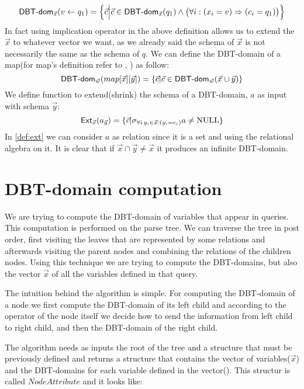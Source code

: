 \documentclass[12pt]{article}
\begin{document}
\begin{equation}
\label{assign2}
\text{\textsf{DBT-dom}{}}_{\vec{x}}(v\gets q_{1})=\Big\{\vec{c}\Big|\vec{c}\in\text{\textsf{DBT-dom}{}}_{\vec{x}}(q_{1})\land \big(\forall i: (x_{i}=v)\Rightarrow(c_{i}=q_{1})\big)\Big\}
\end{equation}
In fact using implication operator in the above definition allows us to extend the $\vec{x}$ to whatever vector we want, as we already said the schema of $\vec{x}$ is not necessarily the same as the schema of $q$. %
We can define the DBT-domain of a map(for map's definition refer to \cite{1}, \cite{2}) as follow:
\begin{equation}
\label{def:map}
\text{\textsf{DBT-dom}}_{\vec{w}}(map[\vec{x}][\vec{y}])=\{\vec{c}|\vec{c}\in\text{\textsf{DBT-dom}}_{\vec{w}}(\vec{x}\cup\vec{y})\}
\end{equation}
We define function \Ext{}  to extend(shrink) the schema of a DBT-domain, $a$ as input with schema $\vec{y}$:
\begin{equation}
\label{def:ext}
\text{\textsf{Ext}}_{\vec{x}}(a_{\vec{y}})=\{\vec{c}|\sigma_{\forall i\,y_{i}\in\vec{x}:(y_{i}=c_{i})}a\neq \text{NULL}\}
\end{equation}
In \eqref{def:ext} we can consider $a$ as relation since it is a set and using the relational algebra on it. 
It is clear that if $\vec{x}\cap\vec{y}\neq\vec{x}$ it produces an infinite DBT-domain. 

\section{DBT-domain computation}\label{DBT-domain}

We are trying to compute the DBT-domain of variables that appear in queries. This computation is performed on the parse tree. We can traverse the tree in post order, first visiting the leaves that are represented by some relations and afterwards visiting the parent nodes and combining the relations of the children nodes. Using this technique we are trying to compute the DBT-domains, but also the vector $\vec x$ of all the variables defined in that query.

The intuition behind the algorithm is simple. For computing the DBT-domain of a node we first compute the DBT-domain of its left child and according to the operator of the node itself we decide how to send the information from left child to right child, and then the DBT-domain of the right child.

The algorithm needs as inputs the root of the tree and a structure that must be previously defined and returns a structure that contains the vector of variables($\vec{x}$) and the DBT-domains for each variable defined in the vector(\dom). This structur is called $NodeAttribute$ and it looks like:
\end{document}
